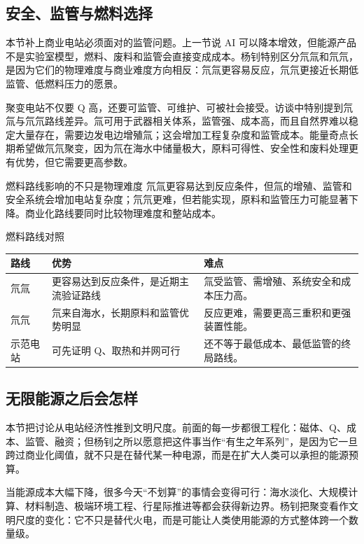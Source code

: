 \subsection{安全、监管与燃料选择}

本节补上商业电站必须面对的监管问题。上一节说 AI 可以降本增效，但能源产品不是实验室模型，燃料、废料和监管会直接变成成本。杨钊特别区分氘氚和氘氘，是因为它们的物理难度与商业难度方向相反：氘氚更容易反应，氘氘更接近长期低监管、低燃料压力的愿景。

聚变电站不仅要 Q 高，还要可监管、可维护、可被社会接受。访谈中特别提到氘氚与氘氘路线差异。氚可用于武器相关体系，监管强、成本高，而且自然界难以稳定大量存在，需要边发电边增殖氚；这会增加工程复杂度和监管成本。能量奇点长期希望做氘氘聚变，因为氘在海水中储量极大，原料可得性、安全性和废料处理更有优势，但它需要更高参数。

\begin{warningbox}{燃料路线影响的不只是物理难度}
氘氚更容易达到反应条件，但氚的增殖、监管和安全系统会增加电站复杂度；氘氘更难，但若能实现，原料和监管压力可能显著下降。商业化路线要同时比较物理难度和整站成本。
\end{warningbox}

\begin{knowledgebox}{燃料路线对照}
\begin{tabularx}{\textwidth}{p{}p{}X}
\toprule
路线 & 优势 & 难点 \\
\midrule
氘氚 & 更容易达到反应条件，是近期主流验证路线 & 氚受监管、需增殖、系统安全和成本压力高。 \\
氘氘 & 氘来自海水，长期原料和监管优势明显 & 反应更难，需要更高三重积和更强装置性能。 \\
示范电站 & 可先证明 Q、取热和并网可行 & 还不等于最低成本、最低监管的终局路线。 \\
\bottomrule
\end{tabularx}
\end{knowledgebox}

\subsection{无限能源之后会怎样}

本节把讨论从电站经济性推到文明尺度。前面的每一步都很工程化：磁体、Q、成本、监管、融资；但杨钊之所以愿意把这件事当作“有生之年系列”，是因为它一旦跨过商业化阈值，就不只是在替代某一种电源，而是在扩大人类可以承担的能源预算。

当能源成本大幅下降，很多今天“不划算”的事情会变得可行：海水淡化、大规模计算、材料制造、极端环境工程、行星际推进等都会获得新边界。杨钊把聚变看作文明尺度的变化：它不只是替代火电，而是可能让人类使用能源的方式整体跨一个数量级。

